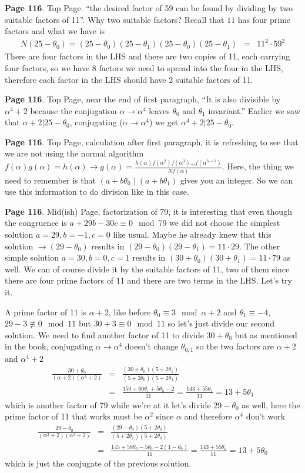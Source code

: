 \documentclass[aps,preprint,preprintnumbers,nofootinbib,showpacs,prd]{revtex4-1}
\newcommand{\nbea}{\begin{eqnarray*}}
\newcommand{\neea}{\end{eqnarray*}}
\begin{document}
{\bf Page 116}. Top Page. ``the desired factor of 59 can be found by dividing by two suitable factors of 11''. Why two suitable factors? Recall that $11$ has four prime factors and what we have is
%
\nbea
N(25 - \theta_0) = (25 - \theta_0)(25 - \theta_1)(25 - \theta_0)(25 - \theta_1) & = & 11^2 \cdot 59^2
\neea
%
There are four factors in the LHS and there are two copies of 11, each carrying four factors, so we have 8 factors we need to spread into the four in the LHS, therefore each factor in the LHS should have 2 suitable factors of 11.

{\bf Page 116}. Top Page, near the end of first paragraph, ``It is also divisible by $\alpha^4 + 2$ because the conjugation $\alpha\to\alpha^4$ leaves $\theta_0$ and $\theta_1$ invariant.'' Earlier we saw that $\alpha + 2|25 - \theta_0$, conjugating ($\alpha \to \alpha^4$) we get $\alpha^4 + 2|25 - \theta_0$.

{\bf Page 116}. Top Page, calculation after first paragraph, it is refreshing to see that we are not using the normal algorithm $f(\alpha) g(\alpha) = h(\alpha) \to g(\alpha) = \frac{h(\alpha)f(\alpha^2)f(\alpha^3) \dots f(\alpha^{\lambda - 1})}{Nf(\alpha)}$. Here, the thing we need to remember is that $(a + b\theta_0)(a + b\theta_1)$ gives you an integer. So we can use this information to do division like in this case.

{\bf Page 116}. Mid(ish) Page, factorization of 79, it is interesting that even though the congruence is $a + 29b - 30c \equiv 0 \mod{79}$ we did not choose the simplest solution $a = 29, b=-1, c=0$ like usual. Maybe he already knew that this solution $\to (29 - \theta_0)$ results in $(29 - \theta_0)(29 - \theta_1) = 11 \cdot 29$. The other simple solution $a = 30, b = 0, c = 1$ results in $(30 + \theta_0)(30 + \theta_1) = 11 \cdot 79$ as well. We can of course divide it by the suitable factors of 11, two of them since there are four prime factors of 11 and there are two terms in the LHS. Let's try it.

A prime factor of 11 is $\alpha + 2$, like before $\theta_0 \equiv 3 \mod{\alpha + 2}$ and $\theta_1 \equiv -4$, $29 - 3 \not \equiv 0 \mod{11}$ but $30 + 3 \equiv 0 \mod{11}$ so let's just divide our second solution. We need to find another factor of 11 to divide $30 + \theta_0$ but as mentioned in the book, conjugating $\alpha \to \alpha^4$ doesn't change $\theta_{0,1}$ so the two factors are $\alpha + 2$ and $\alpha^4 + 2$
%
\nbea
\frac{30 + \theta_0}{(\alpha + 2)(\alpha^4 + 2)} & = & \frac{(30 + \theta_0)(5 + 2\theta_1)}{(5 + 2\theta_0)(5 + 2\theta_1)} \\
& = & \frac{150 + 60\theta_1 + 5\theta_0 - 2}{11} = \frac{143 + 55\theta_1}{11} = 13 + 5\theta_1
\neea
%
which is another factor of $79$ while we're at it let's divide $29 - \theta_0$ as well, here the prime factor of 11 that works must be $\alpha^2$ since $\alpha$ and therefore $\alpha^4$ don't work
%
\nbea
\frac{29 - \theta_0}{(\alpha^2 + 2)(\alpha^3 + 2)} & = & \frac{(29 - \theta_0)(5 + 2\theta_0)}{(5 + 2\theta_1)(5 + 2\theta_0)} \\
& = & \frac{145 + 58\theta_0 - 5\theta_0 - 2(1 - \theta_0)}{11} = \frac{143 + 55\theta_0}{11} = 13 + 5\theta_0
\neea
%
which is just the conjugate of the previous solution.
\end{document}
